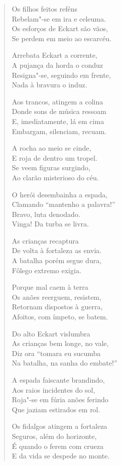 \begin{verse}
Os filhos feitos reféns\\
Rebelam"-se em ira e celeuma.\\
Os esforços de Eckart são vãos,\\
Se perdem em meio ao escarcéu.

Arrebata Eckart a corrente,\\
A pujança da horda o conduz\\
Resigna"-se, seguindo em frente,\\
Nada  à bravura o induz.

Aos trancos, atingem a colina\\
Donde sons de música ressoam\\
E, imediatamente, lá em cima\\
Embargam, silenciam, recuam.

A rocha ao meio se cinde,\\
E roja de dentro um tropel.\\
Se veem figuras surgindo,\\
Ao clarão misterioso do céu.

O herói desembainha a espada,\\
Clamando ``mantenho a palavra!''\\
Bravo, luta denodado.\\
Vinga! Da turba se livra.
 
As crianças recaptura\\
De volta à fortaleza as envia.\\
A batalha porém segue dura,\\
Fôlego extremo exigia. 

Porque mal caem à terra\\
Os anões reerguem, resistem,\\
Retornam dispostos à guerra,\\
Afoitos, com ímpeto, se batem.

Do alto Eckart vislumbra\\
As crianças bem longe, no vale,\\
Diz ora ``tomara eu sucumba\\
Na batalha, na sanha do embate!''

A espada faiscante brandindo,\\
Aos raios incidentes do sol,\\
Roja"-se em fúria anões ferindo\\
Que jaziam estirados em rol.

Os fidalgos atingem a fortaleza\\
Seguros, além do horizonte,\\
É quando o ferem com crueza\\
E da vida se despede no monte.


\end{verse}
